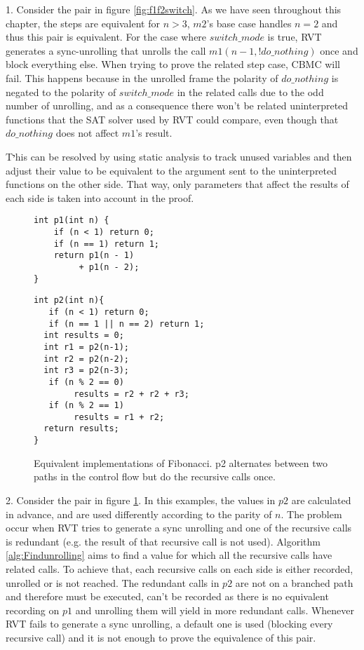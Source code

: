 1. Consider the pair in figure \ref{fig:f1f2switch}. As we have seen throughout this chapter, the steps are equivalent for $n > 3$, $m2$'s base case handles $n=2$ and thus this pair is equivalent. For the case where $switch\_mode$ is true, RVT generates a sync-unrolling that unrolls the call $m1(n-1,!do\_nothing)$ once and block everything else. When trying to prove the related step case, CBMC will fail. This happens because in the unrolled frame the polarity of $do\_nothing$ is negated to the polarity of $switch\_mode$ in the related calls due to the odd number of unrolling, and as a consequence there won't be related uninterpreted functions that the SAT solver used by RVT could compare, even though that $do\_nothing$ does not affect $m1$'s result.

Tיhis can be resolved by using static analysis to track unused variables and then adjust their value to be equivalent to the argument sent to the uninterpreted functions on the other side. That way, only parameters that affect the results of each side is taken into account in the proof.


\begin{figure}[h]
\begin{center}
\begin{minipage}{7 cm}
\begin{lstlisting}
int p1(int n) {
    if (n < 1) return 0;
    if (n == 1) return 1;
    return p1(n - 1) 
         + p1(n - 2);
}
\end{lstlisting}
\end{minipage}
\begin{minipage}{7 cm}
\begin{lstlisting}
int p2(int n){
   if (n < 1) return 0;
   if (n == 1 || n == 2) return 1; 
  int results = 0;
  int r1 = p2(n-1);
  int r2 = p2(n-2);
  int r3 = p2(n-3);
   if (n % 2 == 0)
        results = r2 + r2 + r3;
   if (n % 2 == 1)
        results = r1 + r2;
  return results;
}
\end{lstlisting}
\end{minipage}
\caption{Equivalent implementations of Fibonacci. p2 alternates between two paths in the control flow but do the recursive calls once.}
\label{fig:redundentcalls}
\end{center}
\end{figure}

2. Consider the pair in figure \ref{fig:redundentcalls}. In this examples, the values in $p2$ are calculated in advance, and are used differently according to the parity of $n$. The problem occur when RVT tries to generate a sync unrolling and one of the recursive calls is redundant (e.g. the result of that recursive call is not used). Algorithm \ref{alg:Findunrolling} aims to find a value for which all the recursive calls have related calls. To achieve that, each recursive calls on each side is either recorded, unrolled or is not reached. The redundant calls in $p2$ are not on a branched path and therefore must be executed, can't be recorded as there is no equivalent recording on $p1$ and unrolling them will yield in more redundant calls. Whenever RVT fails to generate a sync unrolling, a default one is used (blocking every recursive call) and it is not enough to prove the equivalence of this pair.

